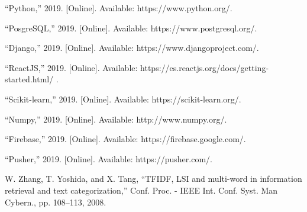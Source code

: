 \documentclass[12pt,letterpaper,openany]{book}
\begin{document}
\begin{thebibliography}{1}
 “Python,” 2019. [Online]. Available: https://www.python.org/.

 “PosgreSQL,” 2019. [Online]. Available: https://www.postgresql.org/.

 “Django,” 2019. [Online]. Available: https://www.djangoproject.com/.

 “ReactJS,” 2019. [Online]. Available: https://es.reactjs.org/docs/getting-started.html/ .

 “Scikit-learn,” 2019. [Online]. Available: https://scikit-learn.org/.

 “Numpy,” 2019. [Online]. Available: http://www.numpy.org/.

 “Firebase,” 2019. [Online]. Available: https://firebase.google.com/.

 “Pusher,” 2019. [Online]. Available: https://pusher.com/.

 W. Zhang, T. Yoshida, and X. Tang, “TFIDF, LSI and multi-word in information retrieval and text categorization,” Conf. Proc. - IEEE Int. Conf. Syst. Man Cybern., pp. 108–113, 2008.


\end{thebibliography}
\end{document}
